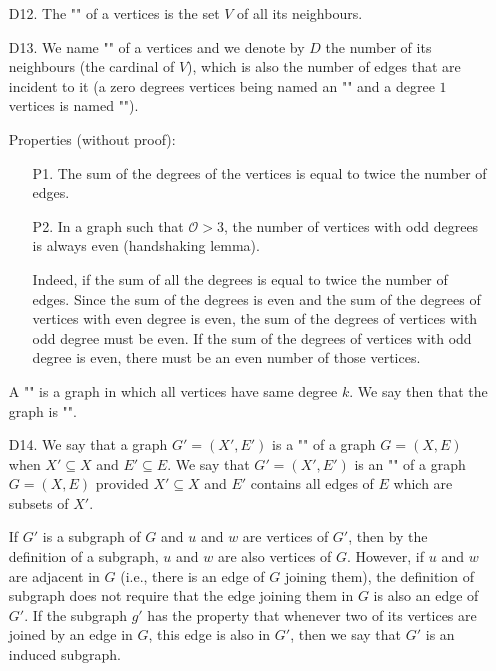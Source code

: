 {\begin{enumerate}
	\item[D12.] The "" of a vertices is the set $V$ of all its neighbours.
	
	\item[D13.]  We name "" of a vertices and we denote by $D$ the number of its neighbours (the cardinal of $V$), which is also the number of edges that are incident to it (a zero degrees vertices being named an "" and a degree $1$ vertices is named "").
	
	Properties (without proof):
	\begin{enumerate}
		\item[P1.] The sum of the degrees of the vertices is equal to twice the number of edges.
		
		
		\item[P2.] In a graph such that  $\mathcal{O}>3$, the number of vertices with odd degrees is always even (handshaking lemma).
		
		Indeed, if the sum of all the degrees is equal to twice the number of edges. Since the sum of the degrees is even and the sum of the degrees of vertices with even degree is even, the sum of the degrees of vertices with odd degree must be even. If the sum of the degrees of vertices with odd degree is even, there must be an even number of those vertices.
	\end{enumerate}
	\begin{tcolorbox}[title=Remark,colframe=black,arc=10pt]
	A "" is a graph in which all vertices have same degree $k$. We say then that the graph is "".
	\end{tcolorbox}
	
	\item[D14.] We say that a graph $G'=(X',E')$ is a "" of a graph $G=(X,E)$ when $X' \subseteq X$ and $E' \subseteq E$. We say that $G'=(X',E')$ is an "" of a graph $G=(X,E)$ provided $X'\subseteq X$ and $E'$ contains all edges of $E$ which are subsets of $X'$.
	
	If $G'$ is a subgraph of $G$ and $u$ and $w$ are vertices of $G'$, then by the definition of a subgraph, $u$ and $w$ are also vertices of $G$. However, if $u$ and $w$ are adjacent in $G$ (i.e., there is an edge of $G$ joining them), the definition of subgraph does not require that the edge joining them in $G$ is also an edge of $G'$. If the subgraph $g'$ has the property that whenever two of its vertices are joined by an edge in $G$, this edge is also in $G'$, then we say that $G'$ is an induced subgraph. 
	

\end{enumerate}}
